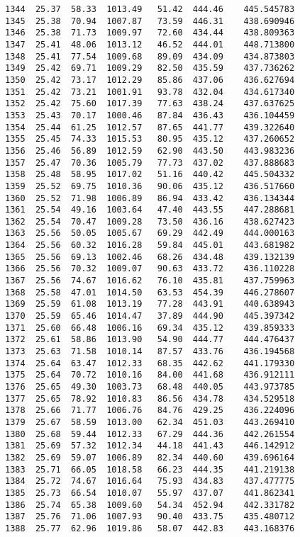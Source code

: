 \documentclass[11pt]{article}
\begin{document}
\begin{tcolorbox}[breakable, size=fbox, boxrule=.5pt, pad at break*=1mm, opacityfill=0]
\begin{Verbatim}[commandchars=\\\{\}]
1344  25.37  58.33  1013.49   51.42  444.46    445.545783
1345  25.38  70.94  1007.87   73.59  446.31    438.690946
1346  25.38  71.73  1009.97   72.60  434.44    438.809363
1347  25.41  48.06  1013.12   46.52  444.01    448.713800
1348  25.41  77.54  1009.68   89.09  434.09    434.873803
1349  25.42  69.71  1009.29   82.50  435.59    437.736262
1350  25.42  73.17  1012.29   85.86  437.06    436.627694
1351  25.42  73.21  1001.91   93.78  432.04    434.617340
1352  25.42  75.60  1017.39   77.63  438.24    437.637625
1353  25.43  70.17  1000.46   87.84  436.43    436.104459
1354  25.44  61.25  1012.57   87.65  441.77    439.322640
1355  25.45  74.33  1015.53   80.95  435.12    437.260652
1356  25.46  56.89  1012.59   62.90  443.50    443.983236
1357  25.47  70.36  1005.79   77.73  437.02    437.888683
1358  25.48  58.95  1017.02   51.16  440.42    445.504332
1359  25.52  69.75  1010.36   90.06  435.12    436.517660
1360  25.52  71.98  1006.89   86.94  433.42    436.134344
1361  25.54  49.16  1003.64   47.40  443.55    447.288681
1362  25.54  70.47  1009.28   73.50  436.16    438.627423
1363  25.56  50.05  1005.67   69.29  442.49    444.000163
1364  25.56  60.32  1016.28   59.84  445.01    443.681982
1365  25.56  69.13  1002.46   68.26  434.48    439.132139
1366  25.56  70.32  1009.07   90.63  433.72    436.110228
1367  25.56  74.67  1016.62   76.10  435.81    437.759963
1368  25.58  47.01  1014.50   63.53  454.39    446.278607
1369  25.59  61.08  1013.19   77.28  443.91    440.638943
1370  25.59  65.46  1014.47   37.89  444.90    445.397342
1371  25.60  66.48  1006.16   69.34  435.12    439.859333
1372  25.61  58.86  1013.90   54.90  444.77    444.476437
1373  25.63  71.58  1010.14   87.57  433.76    436.194568
1374  25.64  63.47  1012.33   68.35  442.62    441.179330
1375  25.64  70.72  1010.16   84.00  441.68    436.912111
1376  25.65  49.30  1003.73   68.48  440.05    443.973785
1377  25.65  78.92  1010.83   86.56  434.78    434.529518
1378  25.66  71.77  1006.76   84.76  429.25    436.224096
1379  25.67  58.59  1013.00   62.34  451.03    443.269410
1380  25.68  59.44  1012.33   67.29  444.36    442.261554
1381  25.69  57.32  1012.34   44.18  441.43    446.142912
1382  25.69  59.07  1006.89   82.34  440.60    439.696164
1383  25.71  66.05  1018.58   66.23  444.35    441.219138
1384  25.72  74.67  1016.64   75.93  434.83    437.477775
1385  25.73  66.54  1010.07   55.97  437.07    441.862341
1386  25.74  65.38  1009.60   54.34  452.94    442.331782
1387  25.76  71.06  1007.93   90.40  433.75    435.480712
1388  25.77  62.96  1019.86   58.07  442.83    443.168376

\end{Verbatim}
\end{tcolorbox}
\end{document}
